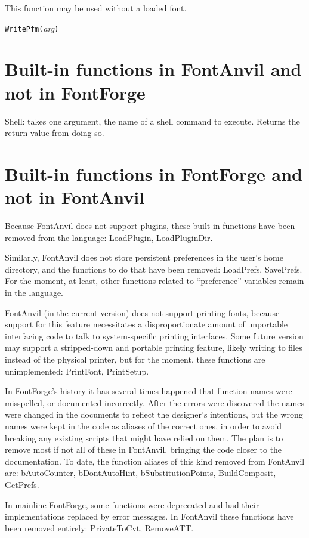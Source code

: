 This function may be used without a loaded font.


\noindent\texttt{WritePfm(}\textit{arg}\texttt{)}


\section{Built-in functions in FontAnvil and not in FontForge}


Shell:  \FFdiff takes
one argument, the name of a shell command to execute.  Returns
the return value from doing so.

\section{Built-in functions in FontForge and not in FontAnvil}

Because \FFdiff FontAnvil does not support plugins, these built-in functions have
been removed from the language:  LoadPlugin, LoadPluginDir.

Similarly, FontAnvil does not store persistent preferences in the user's
home directory, and the functions to do that have been removed: LoadPrefs,
SavePrefs.  For the moment, at least, other functions related to
``preference'' variables remain in the language.

FontAnvil (in the current version) does not support printing fonts, because
support for this feature necessitates a disproportionate amount of
unportable interfacing code to talk to system-specific printing interfaces. 
Some future version may support a stripped-down and portable printing
feature, likely writing to files instead of the physical printer, but for
the moment, these functions are unimplemented:  PrintFont, PrintSetup.

In FontForge's history it has several times happened that function names
were misspelled, or documented incorrectly.  After the errors were
discovered the names were changed in the documents to reflect the designer's
intentions, but the wrong names were kept in the code as aliases of the
correct ones, in order to avoid breaking any existing scripts that might
have relied on them.  The plan is to remove most if not all of these in
FontAnvil, bringing the code closer to the documentation.  To date, the
function aliases of this kind removed from FontAnvil are: bAutoCounter,
bDontAutoHint, bSubstitutionPoints, BuildComposit, GetPrefs.

In mainline FontForge, some functions were deprecated and had their
implementations replaced by error messages.  In FontAnvil these functions
have been removed entirely:  PrivateToCvt, RemoveATT.

